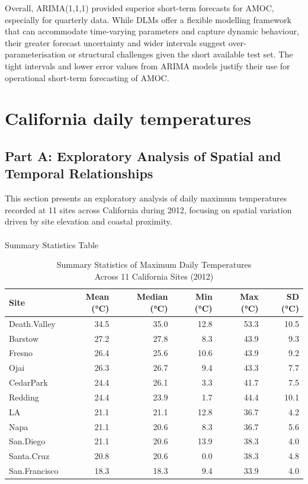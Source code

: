 \documentclass[
  11pt,
]{article}
\makeatletter
\let\oldparagraph\paragraph
\renewcommand{\paragraph}{
    \@ifstar
      \xxxParagraphStar
      \xxxParagraphNoStar
  }
\newcommand{\xxxParagraphStar}[1]{\oldparagraph*{#1}\mbox{}}
\newcommand{\xxxParagraphNoStar}[1]{\oldparagraph{#1}\mbox{}}
\makeatother
\begin{document}
Overall, ARIMA(1,1,1) provided superior short-term forecasts for AMOC,
especially for quarterly data. While DLMs offer a flexible modelling
framework that can accommodate time-varying parameters and capture
dynamic behaviour, their greater forecast uncertainty and wider
intervals suggest over-parameterisation or structural challenges given
the short available test set. The tight intervals and lower error values
from ARIMA models justify their use for operational short-term
forecasting of AMOC.

\section{California daily
temperatures}\label{california-daily-temperatures}

\subsection{Part A: Exploratory Analysis of Spatial and Temporal
Relationships}\label{part-a-exploratory-analysis-of-spatial-and-temporal-relationships}

This section presents an exploratory analysis of daily maximum
temperatures recorded at 11 sites across California during 2012,
focusing on spatial variation driven by site elevation and coastal
proximity.

\paragraph{Summary Statistics Table}\label{summary-statistics-table}

\begin{table}
\caption*{
{\large Summary Statistics of Maximum Daily Temperatures} \\ 
{\small Across 11 California Sites (2012)}
} 
\fontsize{12.0pt}{14.4pt}\selectfont
\begin{tabular*}{\linewidth}{@{\extracolsep{\fill}}lrrrrr}
\toprule
Site & Mean (°C) & Median (°C) & Min (°C) & Max (°C) & SD (°C) \\ 
\midrule\addlinespace[2.5pt]
Death.Valley & 34.5 & 35.0 & 12.8 & 53.3 & 10.5 \\ 
Barstow & 27.2 & 27.8 & 8.3 & 43.9 & 9.3 \\ 
Fresno & 26.4 & 25.6 & 10.6 & 43.9 & 9.2 \\ 
Ojai & 26.3 & 26.7 & 9.4 & 43.3 & 7.7 \\ 
CedarPark & 24.4 & 26.1 & 3.3 & 41.7 & 7.5 \\ 
Redding & 24.4 & 23.9 & 1.7 & 44.4 & 10.1 \\ 
LA & 21.1 & 21.1 & 12.8 & 36.7 & 4.2 \\ 
Napa & 21.1 & 20.6 & 8.3 & 36.7 & 5.6 \\ 
San.Diego & 21.1 & 20.6 & 13.9 & 38.3 & 4.0 \\ 
Santa.Cruz & 20.8 & 20.6 & 0.0 & 38.3 & 4.8 \\ 
San.Francisco & 18.3 & 18.3 & 9.4 & 33.9 & 4.0 \\ 
\bottomrule
\end{tabular*}
\end{table}
\end{document}
